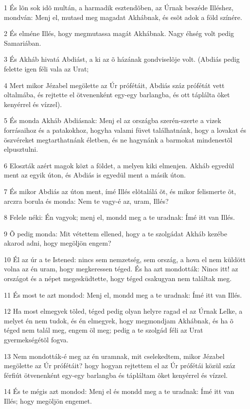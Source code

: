 \par 1 És lõn sok idõ multán, a harmadik esztendõben, az Úrnak beszéde Illéshez, mondván: Menj el, mutasd meg magadat Akhábnak, és esõt adok a föld színére.
\par 2 És elméne Illés, hogy megmutassa magát Akhábnak. Nagy éhség volt pedig Samariában.
\par 3 És Akháb hivatá Abdiást, a ki az õ házának gondviselõje volt. (Abdiás pedig felette igen féli vala az Urat;
\par 4 Mert mikor Jézabel megölette az Úr prófétáit, Abdiás száz prófétát vett oltalmába, és rejtette el ötvenenként egy-egy barlangba, és ott táplálta õket kenyérrel és vízzel).
\par 5 És monda Akháb Abdiásnak: Menj el az országba szerén-szerte a vizek forrásaihoz és a patakokhoz, hogyha valami füvet találhatnánk, hogy a lovakat és öszvéreket megtarthatnánk életben, és ne hagynánk a barmokat mindenestõl elpusztulni.
\par 6 Eloszták azért magok közt a földet, a melyen kiki elmenjen. Akháb egyedül ment az egyik úton, és Abdiás is egyedül ment a másik úton.
\par 7 És mikor Abdiás az úton ment, ímé Illés elõtalálá õt, és mikor felismerte õt, arczra borula és monda: Nem te vagy-é az, uram, Illés?
\par 8 Felele néki: Én vagyok; menj el, mondd meg a te uradnak: Ímé itt van Illés.
\par 9 Õ pedig monda: Mit vétettem ellened, hogy a te szolgádat Akháb kezébe akarod adni, hogy megöljön engem?
\par 10 Él az úr a te Istened: nincs sem nemzetség, sem ország, a hova el nem küldött volna az én uram, hogy megkeressen téged. És ha azt mondották: Nincs itt! az országot és a népet megesküdtette, hogy téged csakugyan nem találtak meg.
\par 11 És most te azt mondod: Menj el, mondd meg a te uradnak: Ímé itt van Illés.
\par 12 Ha most elmegyek tõled, téged pedig olyan helyre ragad el az Úrnak Lelke, a melyet én nem tudok, és én elmegyek, hogy megmondjam Akhábnak, és ha õ téged nem talál meg, engem öl meg; pedig a te szolgád féli az Urat gyermekségétõl fogva.
\par 13 Nem mondották-é meg az én uramnak, mit cselekedtem, mikor Jézabel megölette az Úr prófétáit? hogy hogyan rejtettem el az Úr prófétái közül száz férfiút ötvenenként egy-egy barlangba és tápláltam õket kenyérrel és vízzel.
\par 14 És te mégis azt mondod: Menj el és mondd meg a te uradnak: Ímé itt van Illés; hogy megöljön engemet.
